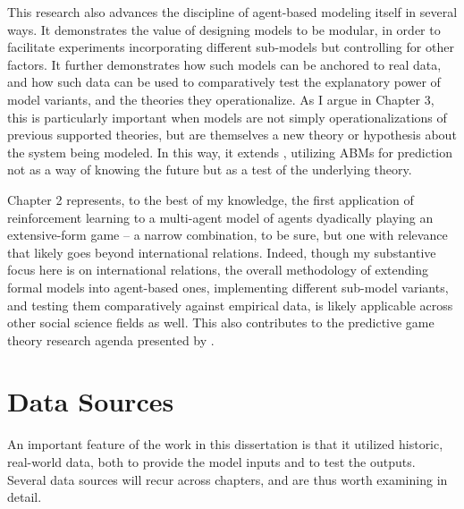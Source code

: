 This research also advances the discipline of agent-based modeling itself in several ways. It demonstrates the value of designing models to be modular, in order to facilitate experiments incorporating different sub-models but controlling for other factors. It further demonstrates how such models can be anchored to real data, and how such data can be used to comparatively test the explanatory power of model variants, and the theories they operationalize. As I argue in Chapter 3, this is particularly important when models are not simply operationalizations of previous supported theories, but are themselves a new theory or hypothesis about the system being modeled. In this way, it extends \citet{epstein_2008}, utilizing ABMs for prediction not as a way of knowing the future but as a test of the underlying theory. 

Chapter 2 represents, to the best of my knowledge, the first application of reinforcement learning to a multi-agent model of agents dyadically playing an extensive-form game -- a narrow combination, to be sure, but one with relevance that likely goes beyond international relations. Indeed, though my substantive focus here is on international relations, the overall methodology of extending formal models into agent-based ones, implementing different sub-model variants, and testing them comparatively against empirical data, is likely applicable across other social science fields as well. This also contributes to the predictive game theory research agenda presented by \citet{fudenberg_2010}.

\section{Data Sources} \label{data-sources}

An important feature of the work in this dissertation is that it utilized historic, real-world data, both to provide the model inputs and to test the outputs. Several data sources will recur across chapters, and are thus worth examining in detail.

